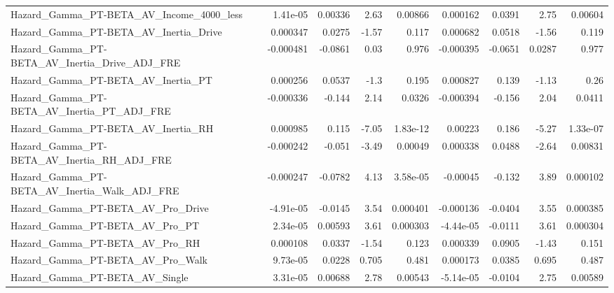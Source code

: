 \begin{tabular}{lrrrrrrrr}
Hazard\_Gamma\_PT-BETA\_AV\_Income\_4000\_less           &    1.41e-05 &      0.00336 &     2.63 &  0.00866 &   0.000162 &      0.0391 &         2.75 &       0.00604 \\
Hazard\_Gamma\_PT-BETA\_AV\_Inertia\_Drive              &    0.000347 &       0.0275 &    -1.57 &    0.117 &   0.000682 &      0.0518 &        -1.56 &         0.119 \\
Hazard\_Gamma\_PT-BETA\_AV\_Inertia\_Drive\_ADJ\_FRE      &   -0.000481 &      -0.0861 &     0.03 &    0.976 &  -0.000395 &     -0.0651 &       0.0287 &         0.977 \\
Hazard\_Gamma\_PT-BETA\_AV\_Inertia\_PT                 &    0.000256 &       0.0537 &     -1.3 &    0.195 &   0.000827 &       0.139 &        -1.13 &          0.26 \\
Hazard\_Gamma\_PT-BETA\_AV\_Inertia\_PT\_ADJ\_FRE         &   -0.000336 &       -0.144 &     2.14 &   0.0326 &  -0.000394 &      -0.156 &         2.04 &        0.0411 \\
Hazard\_Gamma\_PT-BETA\_AV\_Inertia\_RH                 &    0.000985 &        0.115 &    -7.05 & 1.83e-12 &    0.00223 &       0.186 &        -5.27 &      1.33e-07 \\
Hazard\_Gamma\_PT-BETA\_AV\_Inertia\_RH\_ADJ\_FRE         &   -0.000242 &       -0.051 &    -3.49 &  0.00049 &   0.000338 &      0.0488 &        -2.64 &       0.00831 \\
Hazard\_Gamma\_PT-BETA\_AV\_Inertia\_Walk\_ADJ\_FRE       &   -0.000247 &      -0.0782 &     4.13 & 3.58e-05 &   -0.00045 &      -0.132 &         3.89 &      0.000102 \\
Hazard\_Gamma\_PT-BETA\_AV\_Pro\_Drive                  &   -4.91e-05 &      -0.0145 &     3.54 & 0.000401 &  -0.000136 &     -0.0404 &         3.55 &      0.000385 \\
Hazard\_Gamma\_PT-BETA\_AV\_Pro\_PT                     &    2.34e-05 &      0.00593 &     3.61 & 0.000303 &  -4.44e-05 &     -0.0111 &         3.61 &      0.000304 \\
Hazard\_Gamma\_PT-BETA\_AV\_Pro\_RH                     &    0.000108 &       0.0337 &    -1.54 &    0.123 &   0.000339 &      0.0905 &        -1.43 &         0.151 \\
Hazard\_Gamma\_PT-BETA\_AV\_Pro\_Walk                   &    9.73e-05 &       0.0228 &    0.705 &    0.481 &   0.000173 &      0.0385 &        0.695 &         0.487 \\
Hazard\_Gamma\_PT-BETA\_AV\_Single                     &    3.31e-05 &      0.00688 &     2.78 &  0.00543 &  -5.14e-05 &     -0.0104 &         2.75 &       0.00589 \\

\end{tabular}

